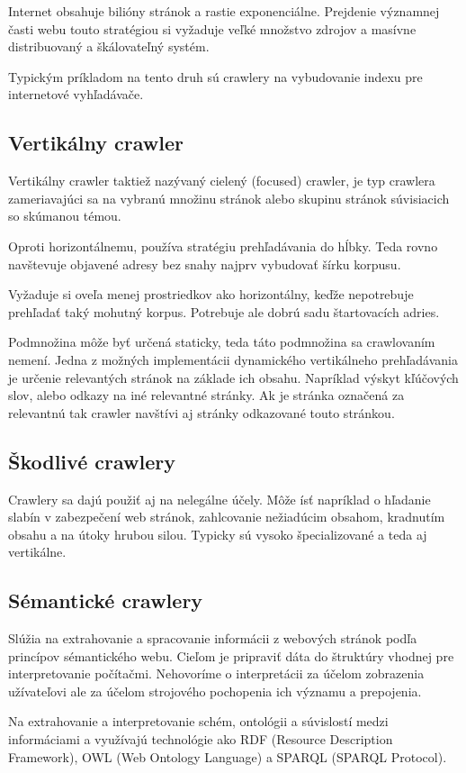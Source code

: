 Internet obsahuje bilióny stránok a rastie exponenciálne. Prejdenie významnej časti webu touto stratégiou si vyžaduje veľké množstvo zdrojov a masívne distribuovaný a škálovateľný systém. 

Typickým príkladom na tento druh sú crawlery na vybudovanie indexu pre internetové vyhľadávače.

\subsection{Vertikálny crawler}
Vertikálny crawler taktiež nazývaný cielený (focused) crawler, je typ crawlera zameriavajúci sa na vybranú množinu stránok alebo skupinu stránok súvisiacich so skúmanou témou.

Oproti horizontálnemu, používa stratégiu prehľadávania do hĺbky. Teda rovno navštevuje objavené adresy bez snahy najprv vybudovať šírku korpusu. 

Vyžaduje si oveľa menej prostriedkov ako horizontálny, keďže nepotrebuje prehľadať taký mohutný korpus. Potrebuje ale dobrú sadu štartovacích adries.

Podmnožina môže byť určená staticky, teda táto podmnožina sa crawlovaním nemení. Jedna z možných implementácii dynamického vertikálneho prehľadávania je určenie relevantých stránok na základe ich obsahu. Napríklad výskyt kľúčových slov, alebo odkazy na iné relevantné stránky. Ak je stránka označená za relevantnú tak crawler navštívi aj stránky odkazované touto stránkou. 

\subsection{Škodlivé crawlery}
Crawlery sa dajú použiť aj na nelegálne účely. Môže ísť napríklad o hľadanie slabín v zabezpečení web stránok, zahlcovanie nežiadúcim obsahom, kradnutím obsahu a na útoky hrubou silou. Typicky sú vysoko špecializované a teda aj vertikálne. 


\subsection{Sémantické crawlery}
Slúžia na extrahovanie a spracovanie informácii z webových stránok podľa princípov sémantického webu. Cieľom je pripraviť dáta do štruktúry vhodnej pre interpretovanie počítačmi. Nehovoríme o interpretácii za účelom zobrazenia užívateľovi ale za účelom strojového pochopenia ich významu a prepojenia. \cite{semanticWeb}

Na extrahovanie a interpretovanie schém, ontológii a  súvislostí medzi informáciami a využívajú technológie ako RDF (Resource Description Framework), OWL (Web Ontology Language) a SPARQL (SPARQL Protocol)\cite{ontologies}.

